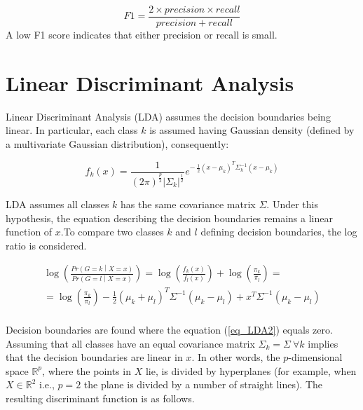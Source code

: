 \begin{equation}
    F1=\frac{2\times precision\times recall}{precision+recall}
    \label{eq_f1Score}
\end{equation}
A low F1 score indicates that either precision or recall is small.

\section{Linear Discriminant Analysis}
Linear Discriminant Analysis (LDA) assumes the decision boundaries being linear. In particular, each class $k$ is assumed having Gaussian density (defined by a multivariate Gaussian distribution), consequently:

\begin{equation}
    f_k\left(x\right)=\frac{1}{\left(2\pi\right)^\frac{p}{2}\left|\Sigma_k\right|^\frac{1}{2}}e^{-\ \frac{1}{2}\left(x-\mu_k\right)^T\Sigma_k^{-1}(x-\mu_k)}
    \label{eq_LDA1}
\end{equation}

LDA assumes all classes $k$ has the same covariance matrix $\Sigma$. Under this hypothesis, the equation describing the decision boundaries remains a linear function of $x$.To compare two classes $k$ and $l$ defining decision boundaries, the log ratio is considered.

\begin{equation}
    \begin{split}
        \log{\left(\frac{Pr{\left(G=k\middle| X=x\right)}}{Pr{\left(G=l\middle| X=x\right)}}\right)}= \log{\left(\frac{f_k\left(x\right)}{f_l\left(x\right)}\right)}+\log{\left(\frac{\pi_k}{\pi_l}\right)}= \\    
        = \log{\left(\frac{\pi_k}{\pi_l}\right)}-\frac{1}{2}\left(\mu_k+\mu_l\right)^T\Sigma^{-1}\left(\mu_k-\mu_l\right)+x^T\Sigma^{-1}(\mu_k-\mu_l)\\
    \end{split}
    \label{eq_LDA2}
\end{equation}

Decision boundaries are found where the equation (\ref{eq_LDA2}) equals zero. Assuming that all classes have an equal covariance matrix $\Sigma_k=\Sigma\ \forall k$ implies that the decision boundaries are linear in $x$. In other words, the $p$-dimensional space $\mathbb{R}^p$, where the points in $X$ lie, is divided by hyperplanes (for example, when $X\in \mathbb{R}^2$ i.e., $p=2$ the plane is divided by a number of straight lines). The resulting discriminant function is as follows.

